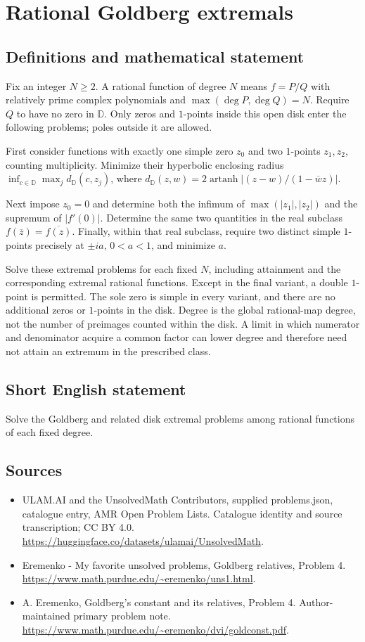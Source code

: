 \documentclass[11pt,a4paper]{article}
\begin{document}
\section*{Rational Goldberg extremals}\label{statement}

\subsection{Definitions and mathematical statement}
Fix an integer $N\geq2$. A rational function of degree
$N$ means $f=P/Q$ with relatively prime complex
polynomials and $\max(\deg P,\deg Q)=N$.
Require $Q$ to have no zero in $\mathbb D$.
Only zeros and $1$-points inside this open disk enter
the following problems; poles outside it are allowed.

First consider functions with exactly one simple zero
$z_0$ and two $1$-points $z_1,z_2$, counting
multiplicity. Minimize their hyperbolic enclosing radius
$\inf_{c\in\mathbb D}\max_jd_{\mathbb D}(c,z_j)$,
where
$d_{\mathbb D}(z,w)=2\operatorname{artanh}
|(z-w)/(1-\overline w z)|$.

Next impose $z_0=0$ and determine both the infimum
of $\max(|z_1|,|z_2|)$ and the supremum of
$|f'(0)|$. Determine the same two quantities in the
real subclass $f(\overline z)=\overline{f(z)}$.
Finally, within that real subclass, require two
distinct simple $1$-points precisely at $\pm ia$,
$0<a<1$, and minimize $a$.

Solve these extremal problems for each fixed $N$,
including attainment and the corresponding extremal
rational functions. Except in the final variant,
a double $1$-point is permitted. The sole zero is
simple in every variant, and there are no additional
zeros or $1$-points in the disk.
Degree is the global rational-map degree, not the
number of preimages counted within the disk. A
limit in which numerator and denominator acquire a
common factor can lower degree and therefore need
not attain an extremum in the prescribed class.
\subsection{Short English statement}
Solve the Goldberg and related disk extremal problems among rational functions of each fixed degree.
\subsection{Sources}
\begin{itemize}
\item[S1] ULAM.AI and the UnsolvedMath Contributors, supplied problems.json, catalogue entry, AMR Open Problem Lists. Catalogue identity and source transcription; CC BY 4.0.
\url{https://huggingface.co/datasets/ulamai/UnsolvedMath}.
\item[S2] Eremenko - My favorite unsolved problems, Goldberg relatives, Problem 4. 
\url{https://www.math.purdue.edu/~eremenko/uns1.html}.
\item[S3] A. Eremenko, Goldberg's constant and its relatives, Problem 4. Author-maintained primary problem note.
\url{https://www.math.purdue.edu/~eremenko/dvi/goldconst.pdf}.
\end{itemize}
\end{document}
